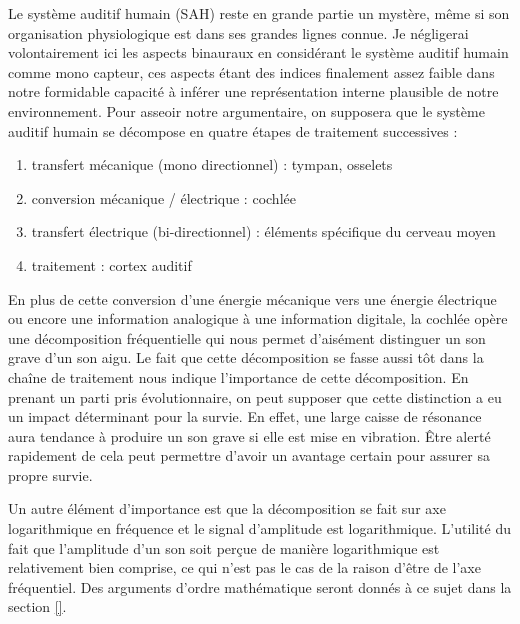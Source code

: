 Le système auditif humain (SAH) reste en grande partie un mystère, même si son organisation physiologique est dans ses grandes lignes connue. Je négligerai volontairement ici les aspects binauraux en considérant le système auditif humain comme mono capteur, ces aspects étant des indices finalement assez faible dans notre formidable capacité à inférer une représentation interne plausible de notre environnement. Pour asseoir notre argumentaire, on supposera que le système auditif humain se décompose en quatre étapes de traitement successives :
\begin{enumerate}
  \item transfert mécanique (mono directionnel) : tympan, osselets
  \item conversion mécanique / électrique : cochlée
  \item transfert électrique (bi-directionnel) : éléments spécifique du cerveau moyen
  \item traitement : cortex auditif
\end{enumerate}

En plus de cette conversion d'une énergie mécanique vers une énergie électrique ou encore une information analogique à une information digitale, la cochlée opère une décomposition fréquentielle qui nous permet d'aisément distinguer un son grave d'un son aigu. Le fait que cette décomposition se fasse aussi tôt dans la chaîne de traitement nous indique l'importance de cette décomposition. En prenant un parti pris évolutionnaire, on peut supposer que cette distinction a eu un impact déterminant pour la survie. En effet, une large caisse de résonance aura tendance à produire un son grave si elle est mise en vibration. Être alerté rapidement de cela peut permettre d'avoir un avantage certain pour assurer sa propre survie.

Un autre élément d'importance est que la décomposition se fait sur axe logarithmique en fréquence et le signal d'amplitude est logarithmique. L'utilité du fait que l'amplitude d'un son soit perçue de manière logarithmique est relativement bien comprise, ce qui n'est pas le cas de la raison d'être de l'axe fréquentiel. Des arguments d'ordre mathématique seront donnés à ce sujet dans la section \ref{}.


